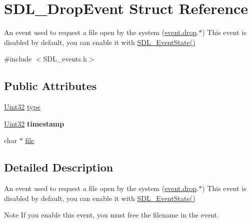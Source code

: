 \hypertarget{struct_s_d_l___drop_event}{}\section{S\+D\+L\+\_\+\+Drop\+Event Struct Reference}
\label{struct_s_d_l___drop_event}


An event used to request a file open by the system (\hyperlink{union_s_d_l___event_acff77bccbca65abbb876360a3f5209c9}{event.\+drop}.$\ast$) This event is disabled by default, you can enable it with \hyperlink{_s_d_l__events_8h_afb772893e1c46f186fa39a4defe76df3}{S\+D\+L\+\_\+\+Event\+State()}  




{\ttfamily \#include $<$S\+D\+L\+\_\+events.\+h$>$}

\subsection*{Public Attributes}
\begin{DoxyCompactItemize}
\item 
\hyperlink{_s_d_l__stdinc_8h_add440eff171ea5f55cb00c4a9ab8672d}{Uint32} \hyperlink{struct_s_d_l___drop_event_a5ea27cfaa5f8d4940e9a69b68b3cc035}{type}
\item 
\hypertarget{struct_s_d_l___drop_event_a02d2c81bb22db632a40cd0021ff751ab}{}\hyperlink{_s_d_l__stdinc_8h_add440eff171ea5f55cb00c4a9ab8672d}{Uint32} {\bfseries timestamp}\label{struct_s_d_l___drop_event_a02d2c81bb22db632a40cd0021ff751ab}

\item 
char $\ast$ \hyperlink{struct_s_d_l___drop_event_abc41ef4beb62e1d8b56827128b29585f}{file}
\end{DoxyCompactItemize}


\subsection{Detailed Description}
An event used to request a file open by the system (\hyperlink{union_s_d_l___event_acff77bccbca65abbb876360a3f5209c9}{event.\+drop}.$\ast$) This event is disabled by default, you can enable it with \hyperlink{_s_d_l__events_8h_afb772893e1c46f186fa39a4defe76df3}{S\+D\+L\+\_\+\+Event\+State()} 

\begin{DoxyNote}{Note}
If you enable this event, you must free the filename in the event. 
\end{DoxyNote}


